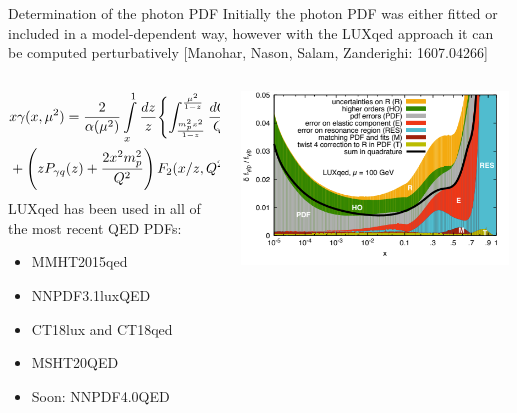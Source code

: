 \documentclass[aspectratio=169, 8pt,t]{beamer}
\begin{document}
\begin{frame}{Determination of the photon PDF}
  Initially the photon PDF was either fitted or included in a model-dependent way, however with the LUXqed approach it can be computed perturbatively {\color{gray}\small [Manohar, Nason, Salam, Zanderighi: 1607.04266]}
  \begin{columns}[T]
    \begin{column}{0.59\textwidth}
      \begin{equation*}
        \begin{split}
          & x \gamma(x, \mu^2)
          =
          \frac{2}{\alpha (\mu^2)} \int\limits_x^1 \frac{dz}{z}
          \Biggl\{ \int_{m_p^2x^2 \over 1-z}^{\mu^2 \over 1-z} \frac{dQ^2}{Q^2}
          \alpha^2(Q^2) \Biggl[ -z^2 F_L(x/z, Q^2) \\
          & + \left( z P_{\gamma q}(z) + \frac{2 x^2 m_p^2}{Q^2} \right)
          F_2(x/z, Q^2)\Biggr] - \alpha^2(\mu^2) z^2 F_2(x/z, \mu^2)\Biggr\}
        \end{split}
      \end{equation*}
      LUXqed has been used in all of the most recent QED PDFs:
      \begin{itemize}
        \item MMHT2015qed
        \item NNPDF3.1luxQED
        \item CT18lux and CT18qed
        \item MSHT20QED
        \item Soon: NNPDF4.0QED
      \end{itemize}
    \end{column}

    \begin{column}{0.39\textwidth}
      \includegraphics[width=0.99\textwidth]{figures/luxQED_uncs.png}
    \end{column}
  \end{columns}
\end{frame}
\end{document}
